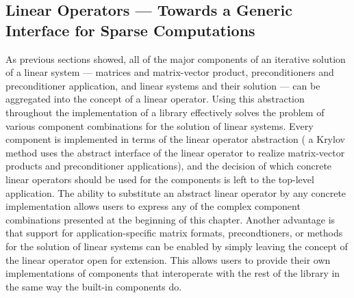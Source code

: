 \subsection{Linear Operators --- Towards a Generic Interface for Sparse
            Computations}
As previous sections showed, all of the major components of an iterative
solution of a linear system --- matrices and matrix-vector product,
preconditioners and preconditioner application, and linear systems and their
solution --- can be aggregated into the concept of a linear operator. Using this
abstraction throughout the implementation of a library effectively solves the
problem of various component combinations for the solution of linear systems.
Every component is implemented in terms of the linear operator abstraction (\eg
a Krylov method uses the abstract interface of the linear operator to realize
matrix-vector products and preconditioner applications), and the decision of
which concrete linear operators should be used for the components is left to the
top-level application. The ability to substitute an abstract linear operator by
any concrete implementation allows users to express any of the complex
component combinations presented at the beginning of this chapter. Another
advantage is that support for application-specific matrix formats,
precondtioners, or methods for the solution of linear systems can be enabled by
simply leaving the concept of the linear operator open for extension. This
allows users to provide their own implementations of components that
interoperate with the rest of the library in the same way the built-in
components do.


